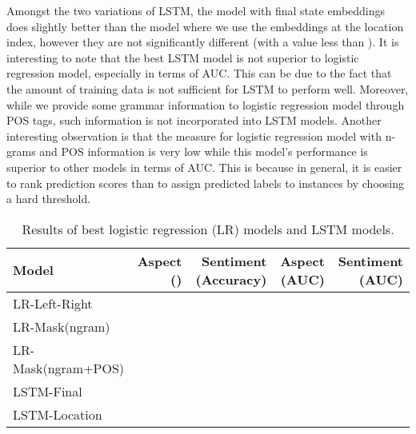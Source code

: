 \documentclass[11pt]{article}
\begin{document}
    Amongst the two variations of LSTM, the model with final state embeddings does slightly better than the model where we use the embeddings at the location index, however they are not significantly different (with a  value less than ). It is interesting to note that the best LSTM model is not superior to logistic regression model, especially in terms of AUC. This can be due to the fact that the amount of training data is not sufficient for LSTM to perform well. Moreover, while we provide some grammar information to logistic regression model through POS tags, such information is not incorporated into LSTM models. Another interesting observation is that the  measure for logistic regression model with n-grams and POS information is very low while this model's performance is superior to other models in terms of AUC. This is because in general, it is easier to rank prediction scores than to assign predicted labels to instances by choosing a hard threshold.
    \begin{table}[ht]
        \centering
        \begin{tabular}{l|r | r || r | r}
            Model    & Aspect () & Sentiment (Accuracy) & Aspect (AUC) & Sentiment (AUC) \\
            \hline
            LR-Left-Right&            &                &                &                \\
            LR-Mask(ngram)&            &                &                &                \\
            LR-Mask(ngram+POS)&            &       &       &       \\
            \hline      
            LSTM-Final&       &                &                &                \\
            LSTM-Location&       &                &                &                \\
        \end{tabular}
        \caption{Results of best logistic regression (LR) models and LSTM models.}
        \label{tab:results_models}
    \end{table}
    
\end{document}

